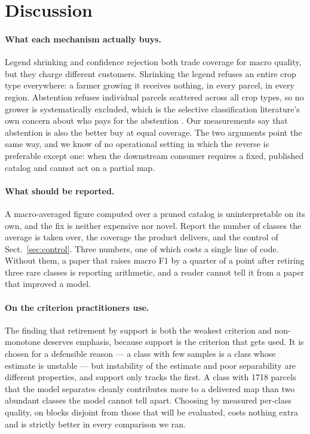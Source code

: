 \section{Discussion}
\label{sec:discussion}

\paragraph{What each mechanism actually buys.}
Legend shrinking and confidence rejection both trade coverage for macro quality, but they charge
different customers. Shrinking the legend refuses an entire crop type everywhere: a farmer growing
it receives nothing, in every parcel, in every region. Abstention refuses individual parcels
scattered across all crop types, so no grower is systematically excluded, which is the selective
classification literature's own concern about who pays for the abstention
\cite{jones2020selectivedisparities}. Our measurements say that abstention is also the better buy
at equal coverage. The two arguments point the same way, and we know of no operational setting in
which the reverse is preferable except one: when the downstream consumer requires a fixed,
published catalog and cannot act on a partial map.

\paragraph{What should be reported.}
A macro-averaged figure computed over a pruned catalog is uninterpretable on its own, and the fix
is neither expensive nor novel. Report the number of classes the average is taken over, the
coverage the product delivers, and the control of Sect.~\ref{sec:control}. Three numbers, one of
which costs a single line of code. Without them, a paper that raises macro F1 by a quarter of a
point after retiring three rare classes is reporting arithmetic, and a reader cannot tell it from a
paper that improved a model.

\paragraph{On the criterion practitioners use.}
The finding that retirement by support is both the weakest criterion and non-monotone deserves
emphasis, because support is the criterion that gets used. It is chosen for a defensible reason ---
a class with few samples is a class whose estimate is unstable --- but instability of the estimate
and poor separability are different properties, and support only tracks the first. A class with
\num{1718} parcels that the model separates cleanly contributes more to a delivered map than two
abundant classes the model cannot tell apart. Choosing by measured per-class quality, on blocks
disjoint from those that will be evaluated, costs nothing extra and is strictly better in every
comparison we ran.

